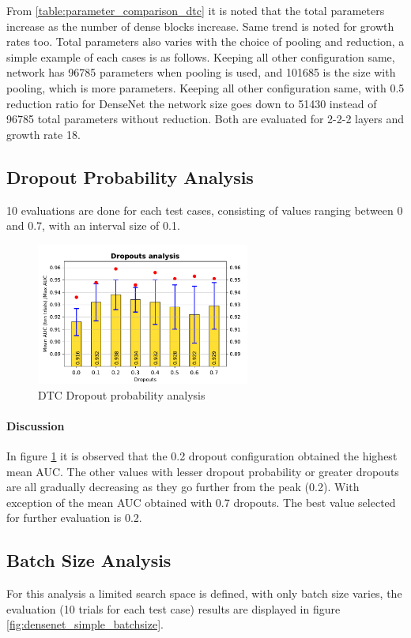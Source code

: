 From \ref{table:parameter_comparison_dtc} it is noted that the total parameters increase as the number of dense blocks increase. Same trend is noted for growth rates too. Total parameters also varies with the choice of pooling and reduction, 
a simple example of each cases is as follows.
Keeping all other configuration same, network has 96785 parameters when  pooling is used, and 101685 is the size with  pooling, which is more parameters.
Keeping all other configuration same, with 0.5 reduction ratio for DenseNet the network size goes down to 51430 instead of 96785 total parameters without reduction. Both are evaluated for 2-2-2 layers and growth rate 18.


\subsection{Dropout Probability Analysis}
10 evaluations are done for each test cases, consisting of values ranging between 0 and 0.7, with an interval size of 0.1.
\begin{figure}[ht]
\centering
\includegraphics[width=7cm]{images/densenet/simple/densenet_simple_dropout}
\caption{DTC Dropout probability analysis}
\label{fig:densenet_simple_dropout}
\end{figure}

\paragraph{Discussion\\}
In figure \ref{fig:densenet_simple_dropout} it is observed that the 0.2 dropout configuration obtained the highest mean AUC. The other values with lesser dropout probability or greater dropouts are all gradually decreasing as they go further 
from the peak (0.2). With exception of the mean AUC obtained with 0.7 dropouts. The best value selected for further evaluation is 0.2.

\subsection{Batch Size Analysis}
For this analysis a limited search space is defined, with only batch size varies, the evaluation (10 trials for each test case) results are displayed in figure \ref{fig:densenet_simple_batchsize}.

